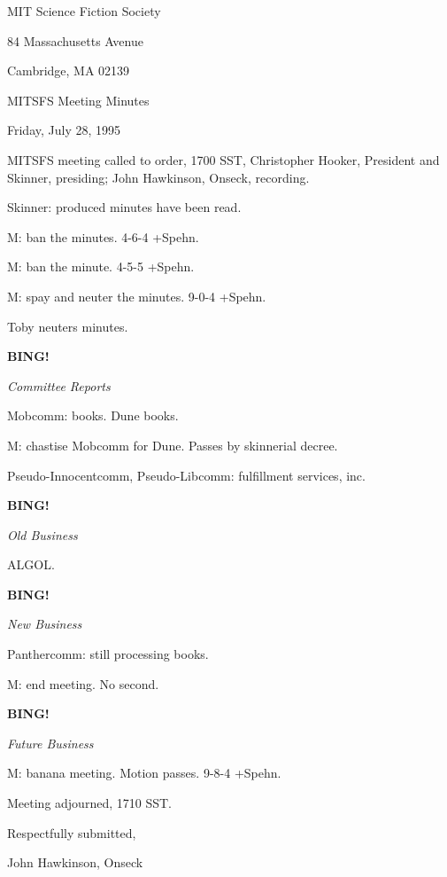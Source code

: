\documentclass[12pt]{article}
\newcommand{\bing}{{\bf BING!} }
\newcommand{\goto}[1]{\bing \vskip 12pt \centerline{{\em{#1}}}}
\begin{document}
\begin{center}

MIT Science Fiction Society 

84 Massachusetts Avenue

Cambridge, MA 02139

\vspace{12pt}

MITSFS Meeting Minutes 

Friday, July 28, 1995

\end{center}
 
\vspace{18pt}

\setlength{\parskip}{6pt}

\noindent
MITSFS meeting called to order, 1700 SST,
Christopher Hooker, President and Skinner, presiding; John Hawkinson, Onseck, recording.

Skinner: produced minutes have been read.

M: ban the minutes. 4-6-4 +Spehn.

M: ban the minute. 4-5-5 +Spehn.

M: spay and neuter the minutes. 9-0-4 +Spehn.

Toby neuters minutes.

\goto{Committee Reports}

Mobcomm: books. Dune books.

M: chastise Mobcomm for Dune. Passes by skinnerial decree.

Pseudo-Innocentcomm, Pseudo-Libcomm: fulfillment services, inc.

\goto{Old Business}

ALGOL.

\goto{New Business}

Panthercomm: still processing books.

M: end meeting. No second.

\goto{Future Business}

M: banana meeting. Motion passes. 9-8-4 +Spehn.

\vspace{12pt}

\noindent
Meeting adjourned, 1710 SST.

\vspace{18pt}

\centerline{Respectfully submitted,}
\centerline{John Hawkinson, Onseck}
\end{document}
